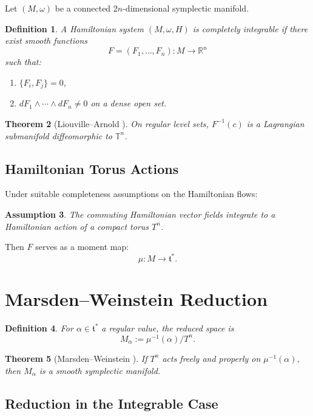 \documentclass[11pt]{article}
\newtheorem{theorem}{Theorem}[section]
\newtheorem{definition}[theorem]{Definition}
\newtheorem{assumption}[theorem]{Assumption}
\begin{document}
Let $(M,\omega)$ be a connected $2n$-dimensional symplectic manifold.

\begin{definition}
A Hamiltonian system $(M,\omega,H)$ is completely integrable if there exist smooth functions
\[
F = (F_1,\dots,F_n): M \to \mathbb{R}^n
\]
such that:
\begin{enumerate}[label=(\roman*)]
\item $\{F_i,F_j\}=0$,
\item $dF_1 \wedge \cdots \wedge dF_n \neq 0$ on a dense open set.
\end{enumerate}
\end{definition}

\begin{theorem}[Liouville--Arnold \cite{Arnold}]
On regular level sets, $F^{-1}(c)$ is a Lagrangian submanifold diffeomorphic to $\mathbb{T}^n$.
\end{theorem}

\subsection{Hamiltonian Torus Actions}

Under suitable completeness assumptions on the Hamiltonian flows:

\begin{assumption}
The commuting Hamiltonian vector fields integrate to a Hamiltonian action of a compact torus $T^n$.
\end{assumption}

Then $F$ serves as a moment map:
\[
\mu : M \to \mathfrak{t}^*.
\]

\section{Marsden--Weinstein Reduction}

\begin{definition}
For $\alpha \in \mathfrak{t}^*$ a regular value, the reduced space is
\[
M_\alpha := \mu^{-1}(\alpha)/T^n.
\]
\end{definition}

\begin{theorem}[Marsden--Weinstein \cite{MarsdenWeinstein}]
If $T^n$ acts freely and properly on $\mu^{-1}(\alpha)$, then $M_\alpha$ is a smooth symplectic manifold.
\end{theorem}

\subsection{Reduction in the Integrable Case}
\end{document}
